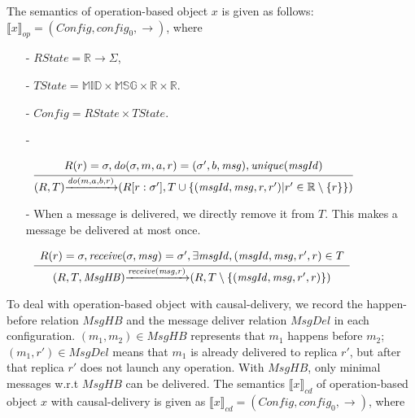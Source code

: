The semantics of operation-based object $x$ is given as follows: $\llbracket x \rrbracket_{\mathit{op}} = (\mathit{Config},\mathit{config}_0,\rightarrow)$, where

\begin{itemize}
\setlength{\itemsep}{0.5pt}
\item[-] $\mathit{RState} = \mathbb{R} \rightarrow \Sigma$,

\item[-] $\mathit{TState} = \mathbb{MID} \times \mathbb{MSG} \times \mathbb{R} \times \mathbb{R}$.

\item[-] $\mathit{Config} = \mathit{RState} \times \mathit{TState}$.

\item[-]

$\begin{array}{l c}
   \bigfrac{
   \begin{array}{c}
     R(r) = \sigma, \mathit{do}(\sigma,m,a,r) = (\sigma',b,\mathit{msg}), \mathit{unique}(\mathit{msgId})
   \end{array}}
     {(R,T) {\xrightarrow{\mathit{do}(m,a,b,r)}} (R[r:\sigma'],T \cup \{ (\mathit{msgId},\mathit{msg},r,r') \vert r' \in \mathbb{R} \setminus \{ r \} \})}
\end{array}$

\item[-] When a message is delivered, we directly remove it from $T$. This makes a message be delivered at most once.

$\begin{array}{l c}
   \bigfrac{
   \begin{array}{c}
      R(r) = \sigma, \mathit{receive}(\sigma,\mathit{msg}) = \sigma', \exists \mathit{msgId},(\mathit{msgId},\mathit{msg},r',r) \in T
   \end{array}}
     {(R,T,\mathit{MsgHB}) {\xrightarrow{\mathit{receive}(\mathit{msg},r)}} (R,T \setminus \{ (\mathit{msgId},\mathit{msg},r',r) \} )} 
\end{array}$
\end{itemize}

To deal with operation-based object with causal-delivery, we record the happen-before relation $\mathit{MsgHB}$ and the message deliver relation $\mathit{MsgDel}$ in each configuration. $(m_1,m_2) \in \mathit{MsgHB}$ represents that $m_1$ happens before $m_2$; $(m_1,r') \in \mathit{MsgDel}$ means that $m_1$ is already delivered to replica $r'$, but after that replica $r'$ does not launch any operation. With $\mathit{MsgHB}$, only minimal messages w.r.t $\mathit{MsgHB}$ can be delivered. The semantics $\llbracket x \rrbracket_{\mathit{cd}}$ of operation-based object $x$ with causal-delivery is given as $\llbracket x \rrbracket_{\mathit{cd}} = (\mathit{Config},\mathit{config}_0,\rightarrow)$, where

